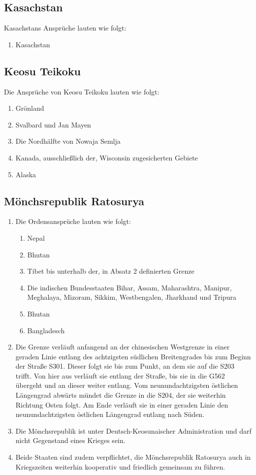 \documentclass{article}
\begin{document}
\subsection{Kasachstan}
Kasachstans Ansprüche lauten wie folgt:
\begin{enumerate}
    \item Kasachstan
\end{enumerate}

\subsection{Keosu Teikoku}
Die Ansprüche von Keosu Teikoku lauten wie folgt:
\begin{enumerate}
    \item Grönland
    \item Svalbard und Jan Mayen
    \item Die Nordhälfte von Nowaja Semlja
    \item Kanada, ausschließlich der, Wisconsin zugesicherten Gebiete
    \item Alaska
\end{enumerate}

\subsection{Mönchsrepublik Ratosurya}\label{order}
\begin{enumerate}[(1)]
    \item Die Ordensansprüche lauten wie folgt:
    \begin{enumerate}[1.]
        \item Nepal
        \item Bhutan
        \item Tibet bis unterhalb der, in Absatz 2 definierten Grenze
        \item Die indischen Bundesstaaten Bihar, Assam, Maharashtra, Manipur, Meghalaya, Mizoram, Sikkim, Westbengalen, Jharkhand und Tripura
        \item Bhutan
        \item Bangladesch
    \end{enumerate}
    \item Die Grenze verläuft anfangend an der chinesischen Westgrenze in einer geraden Linie entlang des achtzigsten südlichen Breitengrades
    bis zum Beginn der Straße S301. Dieser folgt sie bis zum Punkt, an dem sie auf die S203 trifft. Von hier aus verläuft sie entlang der Straße,
    bis sie in die G562 übergeht und an dieser weiter entlang. Vom neunundachtzigsten östlichen Längengrad abwärts mündet die Grenze in die S204, der sie weiterhin Richtung Osten folgt.
    Am Ende verläuft sie in einer geraden Linie den neunundachtzigsten östlichen Längengrad entlang nach Süden. 
    \item Die Mönchsrepublik ist unter Deutsch-Keosunaischer Administration und darf nicht Gegenstand eines Krieges sein.
    \item Beide Staaten sind zudem verpflichtet, die Mönchsrepublik Ratosurya auch in Kriegszeiten weiterhin kooperativ und friedlich gemeinsam zu führen.
\end{enumerate}
\end{document}
